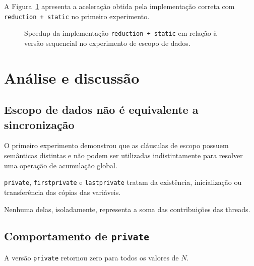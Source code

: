 A Figura~\ref{fig:atvd07-speedup} apresenta a aceleração obtida pela
implementação correta com \texttt{reduction + static} no primeiro
experimento.

\begin{figure}[htbp]
\centering


\caption{Speedup da implementação \texttt{reduction + static} em relação à
versão sequencial no experimento de escopo de dados.}
\label{fig:atvd07-speedup}
\end{figure}


\section{Análise e discussão}
\label{sec:atvd07-discussao}

\subsection{Escopo de dados não é equivalente a sincronização}

O primeiro experimento demonstrou que as cláusulas de escopo possuem
semânticas distintas e não podem ser utilizadas indistintamente para
resolver uma operação de acumulação global.

\texttt{private}, \texttt{firstprivate} e \texttt{lastprivate} tratam da
existência, inicialização ou transferência das cópias das variáveis.

Nenhuma delas, isoladamente, representa a soma das contribuições das
threads.


\subsection{Comportamento de \texttt{private}}

A versão \texttt{private} retornou zero para todos os valores de \(N\).

